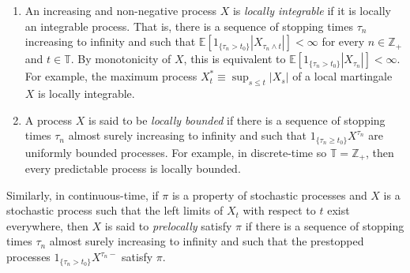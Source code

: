 \documentclass[12pt]{article}
\begin{document}
\begin{enumerate}
\item An increasing and non-negative process $X$ is \emph{locally integrable} if it is locally an integrable process. That is, there is a sequence of stopping times $\tau_n$ increasing to infinity and such that $\mathbb{E}[1_{\{\tau_n>t_0\}}|X_{\tau_n\wedge t}|]<\infty$ for every $n\in\mathbb{Z}_+$ and $t\in\mathbb{T}$. By monotonicity of $X$, this is equivalent to $\mathbb{E}[1_{\{\tau_n>t_0\}}|X_{\tau_n}|]<\infty$. For example, the maximum process $X^*_t\equiv\sup_{s\le t}|X_s|$ of a local martingale $X$ is locally integrable.

\item A process $X$ is said to be \emph{locally bounded} if there is a sequence of stopping times $\tau_n$ almost surely increasing to infinity and such that $1_{\{\tau_n\ge t_0\}}X^{\tau_n}$ are uniformly bounded processes. For example, in discrete-time so $\mathbb{T}=\mathbb{Z}_+$, then every predictable process is locally bounded.
\end{enumerate}

Similarly, in continuous-time, if $\pi$ is a property of stochastic processes and $X$ is a stochastic process such that the left limits of $X_t$ with respect to $t$ exist everywhere, then $X$ is said to \emph{prelocally} satisfy $\pi$ if there is a sequence of stopping times $\tau_n$ almost surely increasing to infinity and such that the prestopped processes $1_{\{\tau_n>t_0\}}X^{\tau_n-}$ satisfy $\pi$.

\end{document}
